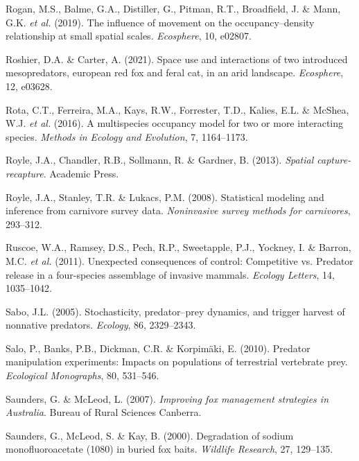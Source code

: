 \documentclass[11pt,a4paper,titlepage,twoside,openright]{style/unimelbthesis}
\begin{document}
\begin{mainmatter}
\leavevmode\hypertarget{ref-rogan2019influence}{}%
Rogan, M.S., Balme, G.A., Distiller, G., Pitman, R.T., Broadfield, J. \& Mann, G.K. \emph{et al.} (2019). The influence of movement on the occupancy--density relationship at small spatial scales. \emph{Ecosphere}, 10, e02807.

\leavevmode\hypertarget{ref-roshier2021space}{}%
Roshier, D.A. \& Carter, A. (2021). Space use and interactions of two introduced mesopredators, european red fox and feral cat, in an arid landscape. \emph{Ecosphere}, 12, e03628.

\leavevmode\hypertarget{ref-rota2016multispecies}{}%
Rota, C.T., Ferreira, M.A., Kays, R.W., Forrester, T.D., Kalies, E.L. \& McShea, W.J. \emph{et al.} (2016). A multispecies occupancy model for two or more interacting species. \emph{Methods in Ecology and Evolution}, 7, 1164--1173.

\leavevmode\hypertarget{ref-royle2013spatial}{}%
Royle, J.A., Chandler, R.B., Sollmann, R. \& Gardner, B. (2013). \emph{Spatial capture-recapture}. Academic Press.

\leavevmode\hypertarget{ref-royle2008statistical}{}%
Royle, J.A., Stanley, T.R. \& Lukacs, P.M. (2008). Statistical modeling and inference from carnivore survey data. \emph{Noninvasive survey methods for carnivores}, 293--312.

\leavevmode\hypertarget{ref-ruscoe2011unexpected}{}%
Ruscoe, W.A., Ramsey, D.S., Pech, R.P., Sweetapple, P.J., Yockney, I. \& Barron, M.C. \emph{et al.} (2011). Unexpected consequences of control: Competitive vs. Predator release in a four-species assemblage of invasive mammals. \emph{Ecology Letters}, 14, 1035--1042.

\leavevmode\hypertarget{ref-sabo2005stochasticity}{}%
Sabo, J.L. (2005). Stochasticity, predator--prey dynamics, and trigger harvest of nonnative predators. \emph{Ecology}, 86, 2329--2343.

\leavevmode\hypertarget{ref-salo2010predator}{}%
Salo, P., Banks, P.B., Dickman, C.R. \& Korpimäki, E. (2010). Predator manipulation experiments: Impacts on populations of terrestrial vertebrate prey. \emph{Ecological Monographs}, 80, 531--546.

\leavevmode\hypertarget{ref-saunders2007improving}{}%
Saunders, G. \& McLeod, L. (2007). \emph{Improving fox management strategies in Australia}. Bureau of Rural Sciences Canberra.

\leavevmode\hypertarget{ref-saunders2000degradation}{}%
Saunders, G., McLeod, S. \& Kay, B. (2000). Degradation of sodium monofluoroacetate (1080) in buried fox baits. \emph{Wildlife Research}, 27, 129--135.


\end{mainmatter}
\end{document}
